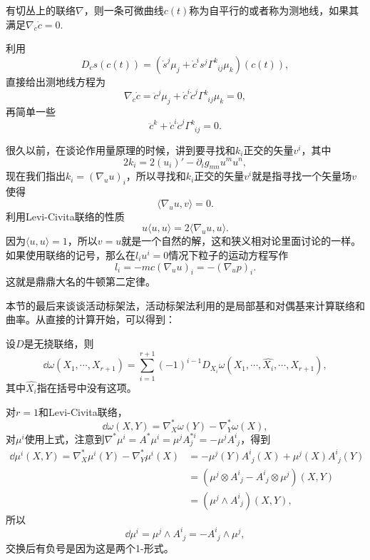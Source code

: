 \para 有切丛上的联络$\nabla$，则一条可微曲线$c(t)$称为自平行的或者称为测地线，如果其满足$\nabla_{\dot{c}}\dot{c}=0$.

利用
\[
D_{\dot{c}}s(c(t))=\left(\dot{s}^j\mu_j+\dot{c}^i s^j\Gamma^k_{\phantom{k}ij}\mu_k\right)(c(t)),
\]
直接给出测地线方程为
\[
\nabla_{\dot{c}}\dot{c}=\ddot{c}^j\mu_j+\dot{c}^i \dot{c}^j\Gamma^k_{\phantom{k}ij}\mu_k=0,
\]
再简单一些
\[
\ddot{c}^k+\dot{c}^i \dot{c}^j\Gamma^k_{\phantom{k}ij}=0.
\]

很久以前，在谈论作用量原理的时候，讲到要寻找和$k_i$正交的矢量$v^i$，其中
\[
	2k_i=2(u_i)'-\partial_ig_{mn}u^mu^n,
\]
现在我们指出$k_i=(\nabla_{u}u)_i$，所以寻找和$k_i$正交的矢量$v^i$就是指寻找一个矢量场$v$使得
\[
	\langle \nabla_{u}u,v\rangle=0.
\]
利用Levi-Civita联络的性质
\[
	u\langle u,u\rangle=2\langle \nabla_{u}u,u\rangle.
\]
因为$\langle u,u\rangle=1$，所以$v=u$就是一个自然的解，这和狭义相对论里面讨论的一样。如果使用联络的记号，那么在$l_iu^i=0$情况下粒子的运动方程写作
\[
	l_i=-mc(\nabla_{u}u)_i=-(\nabla_{u}p)_i.
\]
这就是鼎鼎大名的牛顿第二定律。

本节的最后来谈谈活动标架法，活动标架法利用的是局部基和对偶基来计算联络和曲率。从直接的计算开始，可以得到：

\pro 设$D$是无挠联络，则
\[
	\dd \omega(X_1,\cdots,X_{r+1})=\sum_{i=1}^{r+1}(-1)^{i-1}D_{X_i}\omega(X_1,\cdots,\hat{X_i},\cdots,X_{r+1}),
\]
其中$\hat{X_i}$指在括号中没有这项。

对$r=1$和Levi-Civita联络，
\[
	\dd \omega(X,Y)=\nabla^*_{X}\omega(Y)-\nabla^*_{Y}\omega(X),
\]
对$\mu^i$使用上式，注意到$\nabla^*\mu^i=A^*\mu^i=\mu^jA^{*i}_j=-\mu^jA^i_{\phantom{i}j}$，得到
\begin{align*}
	\dd \mu^i(X,Y)=\nabla^*_{X}\mu^i(Y)-\nabla^*_{Y}\mu^i(X)&=-\mu^j(Y)A^i_{\phantom{i}j}(X)+\mu^j(X)A^i_{\phantom{i}j}(Y)\\
	&=(\mu^j\otimes A^i_{\phantom{i}j}-A^i_{\phantom{i}j}\otimes \mu^j)(X,Y)\\
	&=(\mu^j\wedge A^i_{\phantom{i}j})(X,Y),
\end{align*}
所以
\begin{equation}
	\dd \mu^i=\mu^j\wedge A^i_{\phantom{i}j}=-A^i_{\phantom{i}j}\wedge \mu^j,
	\label{cartan1}
\end{equation}
交换后有负号是因为这是两个1-形式。

